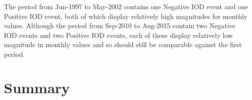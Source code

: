 The period from Jun-1997 to May-2002 contains one Negative \ac{IOD} event and one Positive \ac{IOD} event, both of which display relatively high magnitudes for monthly values. Although the period from Sep-2010 to Aug-2015 contain two Negative \ac{IOD} events and two Positive \ac{IOD} events, each of these display relatively low magnitude in monthly values and so should still be comparable against the first period.

\section*{Summary}
\enlargethispage{\baselineskip} %